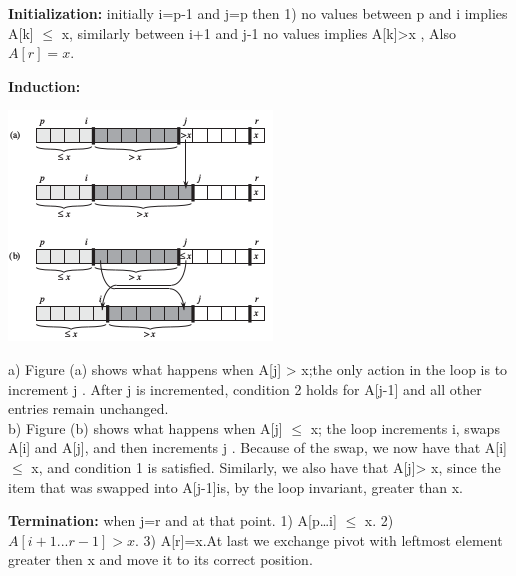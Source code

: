 \documentclass[11pt]{article}
\begin{document}
\textbf{Initialization:} initially i=p-1 and j=p then 1) no values between p and i implies A[k] \(\le\) x, similarly between i+1 and j-1 
no values implies A[k]>x , Also \(A[r]=x\).

\textbf{Induction:} \begin{center}
\includegraphics[width=.9\linewidth]{./img/quicksort_correctness.png}
\end{center}
a) Figure (a) shows what happens when A[j] > x;the only action in the loop is to increment j . After j is incremented, condition 2
holds for A[j-1] and all other entries remain unchanged.\\
b) Figure (b) shows what happens when A[j] \(\le\) x; the loop increments i, swaps A[i] and A[j], and then increments j . 
Because of the swap, we now have that A[i] \(\le\) x, and condition 1 is satisfied. Similarly, we also have that A[j]> x, since the
item that was swapped into A[j-1]is, by the loop invariant, greater than x.

\textbf{Termination:} when j=r and at that point. 1) A[p\ldots{}i] \(\le\) x. 2) \(A[i+1...r-1]>x\). 3) A[r]=x.At last we exchange pivot with 
leftmost element greater then x and move it to its correct position.
\end{document}
